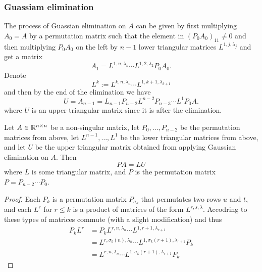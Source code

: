 \documentclass[11pt,a4paper]{article}
\begin{document}
\subsubsection{Guassiam elimination}
The process of Guassian elimination on $A$ can be given by first multiplying
$A_0 = A$ by a permutation matrix such that the element in
$(P_0 A_0)_{11} \neq 0$ and then multiplying $P_0 A_0$ on the left
by $n - 1$ lower triangular matrices $L^{1,j,\lambda_j}$ and get a matrix
\[
  A_1 = L^{1,n,\lambda_n} \cdots L^{1,2,\lambda_2} P_0 A_0.
\]
Denote
\[
  L^{k} := L^{k,n,\lambda_n} \cdots L^{1,k+1,\lambda_{k+1}}
\]
and then by the end of the elimination we have
\[
  U = A_{n-1} = L_{n-1} P_{n-2} L^{n-2} P_{n-3} \cdots L^1 P_0 A.
\]
where $U$ is an upper triangular matrix since it is after the elimination.

\begin{theorem}[$LU$ decomposition]
  Let $A \in \mathbb{R}^{n \times n}$ be a non-singular matrix,
  let $P_0,\dots,P_{n-2}$ be the permutation matrices from above,
  let $L^{n-1},\dots,L^1$ be the lower triangular matrices from above,
  and let $U$ be the upper triangular matrix obtained from applying
  Gaussian elimination on $A$.
  Then
  \[
    PA = LU
  \]
  where $L$ is some triangular matrix, and $P$ is the permutation matrix
  $P = P_{n-2} \cdots P_{0}$.
\end{theorem}
\begin{proof}
  Each $P_k$ is a permutation matrix $P_{\sigma_k}$ that permutates
  two rows $u$ and $t$, and each $L^r$ for $r \le k$ is a product of
  matrices of the form $L^{r,s,\lambda}$.
  Accodring to  these types of matrices
  commute (with a slight modification) and thus
  \begin{align*}
    P_k L^r &=
    P_k L^{r,n,\lambda_n} \cdots L^{1,r+1,\lambda_{r+1}} \\ &=
    L^{r,\sigma_k(n),\lambda_n} \cdots L^{1,\sigma_k(r+1),\lambda_{r+1}}
    P_k \\ &=
    L^{r,n,\lambda_n} \cdots L^{1,\sigma_k(r+1),\lambda_{r+1}} P_k
  \end{align*}
\end{proof}
\end{document}
